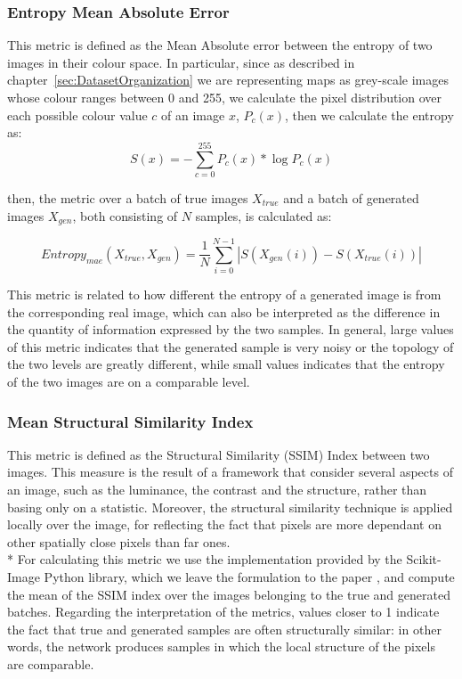 \subsubsection{Entropy Mean Absolute Error}
This metric is defined as the Mean Absolute error between the entropy of two images in their colour space. In particular, since as described in chapter~\ref{sec:DatasetOrganization} we are representing maps as grey-scale images whose colour ranges between 0 and 255, we calculate the pixel distribution over each possible colour value $c$ of an image $x$, $P_{c}(x)$, then we calculate the entropy as:
\begin{equation}
	S(x) = - \sum_{c=0}^{255}{ P_{c}(x) * \log{P_{c}(x)} }
\end{equation}

then, the metric over a batch of true images $X_{true}$ and a batch of generated images $X_{gen}$, both consisting of $N$ samples, is calculated as:

\begin{equation}
Entropy_{mae}(X_{true}, X_{gen}) = \frac{1}{N}\sum_{i=0}^{N-1} | S(X_{gen}(i)) - S(X_{true}(i)) |
\end{equation}

This metric is related to how different the entropy of a generated image is from the corresponding real image, which can also be interpreted as the difference in the quantity of information expressed by the two samples. In general, large values of this metric indicates that the generated sample is very noisy or the topology of the two levels are greatly different, while small values indicates that the entropy of the two images are on a comparable level. 

\subsubsection{Mean Structural Similarity Index}
This metric is defined as the Structural Similarity (SSIM) Index \cite{ssim} between two images.  This measure is the result of a framework that consider several aspects of an image, such as the luminance, the contrast and the structure, rather than basing only on a statistic. Moreover, the structural similarity technique is applied locally over the image, for reflecting the fact that pixels are more dependant on other spatially close pixels than far ones. \\*
For calculating this metric we use the implementation provided by the Scikit-Image Python library, which we leave the formulation to the paper \cite[p.~604]{ssim}, and compute the mean of the SSIM index over the images belonging to the true and generated batches. Regarding the interpretation of the metrics, values closer to 1 indicate the fact that true and generated samples are often structurally similar: in other words, the network produces samples in which the local structure of the pixels are comparable.

